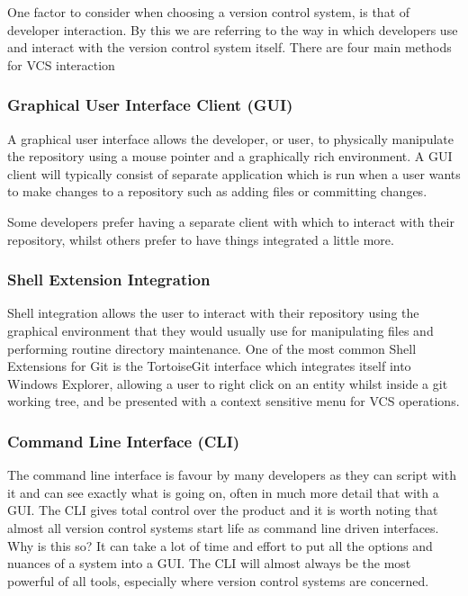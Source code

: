One factor to consider when choosing a version control system, is that of developer interaction.
By this we are referring to the way in which developers use and interact with the version control system itself.
There are four main methods for VCS interaction

\subsubsection{Graphical User Interface Client (GUI)}

A graphical user interface allows the developer, or user, to physically manipulate the repository using a mouse pointer and a graphically rich environment.
A GUI client will typically consist of separate application which is run when a user wants to make changes to a repository such as adding files or committing changes.

Some developers prefer having a separate client with which to interact with their repository, whilst others prefer to have things integrated a little more.

\subsubsection{Shell Extension Integration}

Shell integration allows the user to interact with their repository using the graphical environment that they would usually use for manipulating files and performing routine directory maintenance.
One of the most common Shell Extensions for Git is the TortoiseGit interface which integrates itself into Windows Explorer, allowing a user to right click on an entity whilst inside a git working tree, and be presented with a context sensitive menu for VCS operations.

\subsubsection{Command Line Interface (CLI)}

The command line interface is favour by many developers as they can script with it and can see exactly what is going on, often in much more detail that with a GUI.
The CLI gives total control over the product and it is worth noting that almost all version control systems start life as command line driven interfaces.
Why is this so? It can take a lot of time and effort to put all the options and nuances of a system into a GUI.
The CLI will almost always be the most powerful of all tools, especially where version control systems are concerned.

